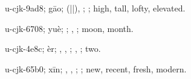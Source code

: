 \begin{multicols}{2}
{\cjkgGlue{}u-cjk-9ad8; gāo; \cjkgGlue{}\cjkgGlue{}(\cjkgGlue{}|\cjkgGlue{}|\cjkgGlue{}), \cjkgGlue{}; \cjkgGlue{}; high, tall, lofty, elevated.

\cjkgGlue{}u-cjk-6708; yuè; \cjkgGlue{}; \cjkgGlue{}, \cjkgGlue{}; moon, month.

\cjkgGlue{}u-cjk-4e8c; èr; \cjkgGlue{}, \cjkgGlue{}\cjkgGlue{}\cjkgGlue{}, \cjkgGlue{}\cjkgGlue{}\cjkgGlue{}; \cjkgGlue{}, \cjkgGlue{}; two.

\cjkgGlue{}u-cjk-65b0; xīn; \cjkgGlue{}\cjkgGlue{}\cjkgGlue{}, \cjkgGlue{}\cjkgGlue{}\cjkgGlue{}, \cjkgGlue{}; \cjkgGlue{}; new, recent, fresh, modern.

}
\end{multicols}
